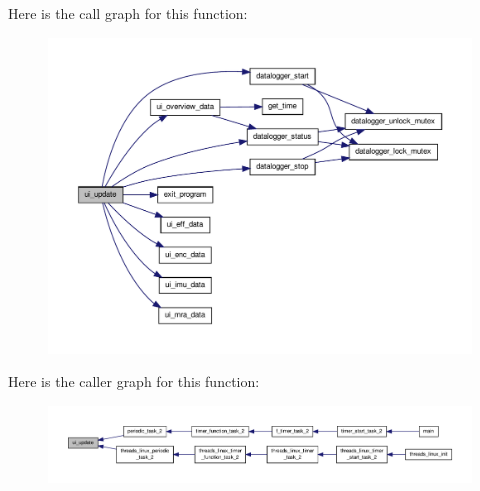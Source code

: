 Here is the call graph for this function\-:\nopagebreak
\begin{figure}[H]
\begin{center}
\leavevmode
\includegraphics[width=350pt]{group__ui_ga42e4dac2d138061a74c572358c8ebf49_cgraph}
\end{center}
\end{figure}




Here is the caller graph for this function\-:\nopagebreak
\begin{figure}[H]
\begin{center}
\leavevmode
\includegraphics[width=350pt]{group__ui_ga42e4dac2d138061a74c572358c8ebf49_icgraph}
\end{center}
\end{figure}


